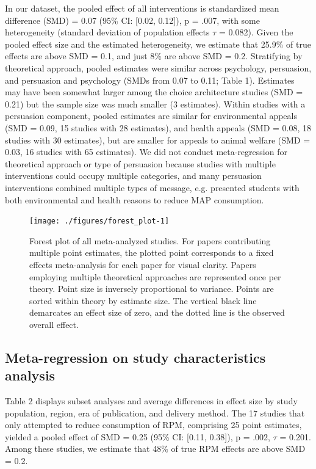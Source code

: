 \documentclass[sn-nature,referee,pdflatex]{sn-jnl}
\begin{document}
In our dataset, the pooled effect of all interventions is standardized
mean difference (SMD) = 0.07 (95\% CI: {[}0.02, 0.12{]}), p = .007, with
some heterogeneity (standard deviation of population effects \(\tau\) =
0.082). Given the pooled effect size and the estimated heterogeneity, we
estimate that 25.9\% of true effects are above SMD = 0.1, and just 8\%
are above SMD = 0.2. Stratifying by theoretical approach, pooled
estimates were similar across psychology, persuasion, and persuasion and
psychology (SMDs from 0.07 to 0.11; Table 1). Estimates may have been
somewhat larger among the choice architecture studies (SMD = 0.21) but
the sample size was much smaller (3 estimates). Within studies with a
persuasion component, pooled estimates are similar for environmental
appeals (SMD = 0.09, 15 studies with 28 estimates), and health appeals
(SMD = 0.08, 18 studies with 30 estimates), but are smaller for appeals
to animal welfare (SMD = 0.03, 16 studies with 65 estimates). We did not
conduct meta-regression for theoretical approach or type of persuasion
because studies with multiple interventions could occupy multiple
categories, and many persuasion interventions combined multiple types of
message, e.g. \citep{jalil2023} presented students with both
environmental and health reasons to reduce MAP consumption.

\begin{figure}[H]

{\centering \texttt{[image: ./figures/forest\_plot-1]} 

}

\caption{Forest plot of all meta-analyzed studies. For papers contributing multiple point estimates, the plotted point corresponds to a fixed effects meta-analysis for each paper for visual clarity. Papers employing multiple theoretical approaches are represented once per theory. Point size is inversely proportional to variance. Points are sorted within theory by estimate size. The vertical black line demarcates an effect size of zero, and the dotted line is the observed overall effect.}\label{fig:forest_plot}
\end{figure}

\subsection{Meta-regression on study characteristics
analysis}\label{sec2.4}

Table 2 displays subset analyses and average differences in effect size
by study population, region, era of publication, and delivery method.
The 17 studies that only attempted to reduce consumption of RPM,
comprising 25 point estimates, yielded a pooled effect of SMD = 0.25
(95\% CI: {[}0.11, 0.38{]}), p = .002, \(\tau\) = 0.201. Among these
studies, we estimate that 48\% of true RPM effects are above SMD = 0.2.
\end{document}
